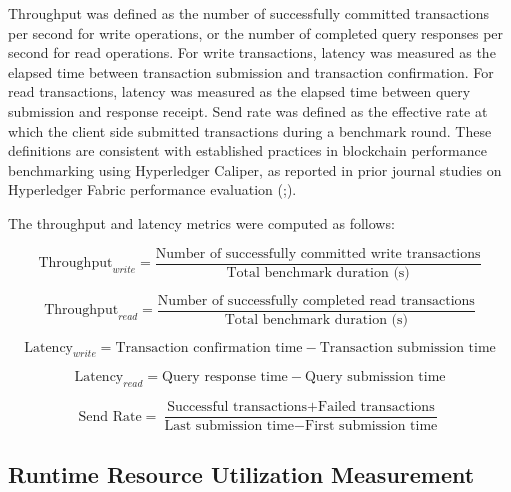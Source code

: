 \documentclass[12pt]{article}
\begin{document}
	Throughput was defined as the number of successfully committed transactions per second for write operations, or the number of completed query responses per second for read operations. For write transactions, latency was measured as the elapsed time between transaction submission and transaction confirmation. For read transactions, latency was measured as the elapsed time between query submission and response receipt. Send rate was defined as the effective rate at which the client side submitted transactions during a benchmark round. These definitions are consistent with established practices in blockchain performance benchmarking using Hyperledger Caliper, as reported in prior journal studies on Hyperledger Fabric performance evaluation (\cite{kaushal_convergence_2025};\cite{kumar_integrating_2026}).
	
	The throughput and latency metrics were computed as follows:
	
	\begin{equation}
		\text{Throughput}_{write} = \frac{\text{Number of successfully committed write transactions}}{\text{Total benchmark duration (s)}}
	\end{equation}
	
	\begin{equation}
		\text{Throughput}_{read} = \frac{\text{Number of successfully completed read transactions}}{\text{Total benchmark duration (s)}}
	\end{equation}
	
	\begin{equation}
		\text{Latency}_{write} = \text{Transaction confirmation time} - \text{Transaction submission time}
	\end{equation}
	
	\begin{equation}
		\text{Latency}_{read} = \text{Query response time} - \text{Query submission time}
	\end{equation}
	
	\begin{equation}
		\text{Send Rate} = \frac{\text{Successful transactions} + \text{Failed transactions}}{\text{Last submission time} - \text{First submission time}}
	\end{equation}
	
	\subsection{Runtime Resource Utilization Measurement}
	
\end{document}
